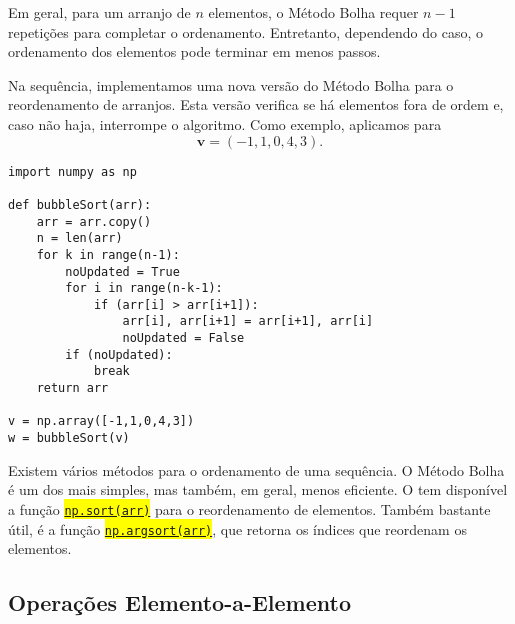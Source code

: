 \begin{obs}
  Em geral, para um arranjo de $n$ elementos, o Método Bolha requer $n-1$ repetições para completar o ordenamento. Entretanto, dependendo do caso, o ordenamento dos elementos pode terminar em menos passos.
\end{obs}

\begin{ex}
  Na sequência, implementamos uma nova versão do Método Bolha para o reordenamento de arranjos. Esta versão verifica se há elementos fora de ordem e, caso não haja, interrompe o algoritmo. Como exemplo, aplicamos para
  \begin{equation}
    \pmb{v} = (-1, 1, 0, 4, 3).
  \end{equation}
  
\begin{lstlisting}[caption=bubbleSort\_v2.py]
import numpy as np

def bubbleSort(arr):
    arr = arr.copy()
    n = len(arr)
    for k in range(n-1):
        noUpdated = True
        for i in range(n-k-1):
            if (arr[i] > arr[i+1]):
                arr[i], arr[i+1] = arr[i+1], arr[i]
                noUpdated = False
        if (noUpdated):
            break
    return arr

v = np.array([-1,1,0,4,3])
w = bubbleSort(v)
\end{lstlisting}
\end{ex}

\begin{obs}
  Existem vários métodos para o ordenamento de uma sequência. O Método Bolha é um dos mais simples, mas também, em geral, menos eficiente. O {\numpy} tem disponível a função \hl{{\href{https://numpy.org/doc/stable/reference/generated/numpy.sort.html}{\lstinline+np.sort(arr)+}}} para o reordenamento de elementos. Também bastante útil, é a função \hl{{\href{https://numpy.org/doc/stable/reference/generated/numpy.argsort.html\#numpy.argsort}{\lstinline+np.argsort(arr)+}}}, que retorna os índices que reordenam os elementos.
\end{obs}

\subsection{Operações Elemento-a-Elemento}

